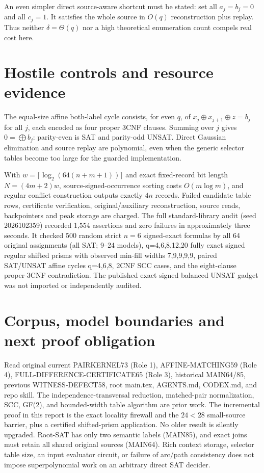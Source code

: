 \documentclass[10pt]{article}
\begin{document}
An even simpler direct source-aware shortcut must be stated: set all $a_j=b_j=0$ and all $c_j=1$. It satisfies the whole source in $O(q)$ reconstruction plus replay. Thus neither $\delta=\Theta(q)$ nor a high theoretical enumeration count compels real cost here.

\section{Hostile controls and resource evidence}
The equal-size affine both-label cycle consists, for even $q$, of $x_j\oplus x_{j+1}\oplus z=b_j$ for all $j$, each encoded as four proper 3CNF clauses. Summing over $j$ gives $0=\bigoplus b_j$: parity-even is SAT and parity-odd UNSAT. Direct Gaussian elimination and source replay are polynomial, even when the generic selector tables become too large for the guarded implementation.

With $w=\lceil\log_2(64(n+m+1))\rceil$ and exact fixed-record bit length $N=(4m+2)w$, source-signed-occurrence sorting costs $O(m\log m)$, and regular conflict construction outputs exactly $4n$ records. Failed candidate table rows, certificate verification, original/auxiliary reconstruction, source reads, backpointers and peak storage are charged. The full standard-library audit (seed 2026102359) recorded 1,554 assertions and zero failures in approximately three seconds. It checked 500 random strict $n=6$ signed-exact formulas by all 64 original assignments (all SAT; 9--24 models), q=4,6,8,12,20 fully exact signed regular shifted prisms with observed min-fill widths 7,9,9,9,9, paired SAT/UNSAT affine cycles q=4,6,8, 2CNF SCC cases, and the eight-clause proper-3CNF contradiction. The published exact signed balanced UNSAT gadget was not imported or independently audited.

\section{Corpus, model boundaries and next proof obligation}
Read original current PAIRKERNEL73 (Role 1), AFFINE-MATCHING59 (Role 4), FULL-DIFFERENCE-CERTIFICATE65 (Role 3), historical MAIN64/85, previous WITNESS-DEFECT58, root main.tex, AGENTS.md, CODEX.md, and repo skill. The independence-transversal reduction, matched-pair normalization, SCC, GF(2), and bounded-width table algorithm are prior work. The incremental proof in this report is the exact locality firewall and the $24<28$ small-source barrier, plus a certified shifted-prism application. No older result is silently upgraded. Root-SAT has only two semantic labels (MAIN85), and exact joins must retain all shared original sources (MAIN64). Rich context storage, selector table size, an input evaluator circuit, or failure of arc/path consistency does not impose superpolynomial work on an arbitrary direct SAT decider.
\end{document}
